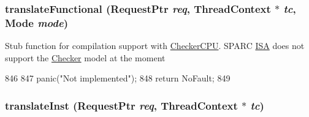 \hypertarget{classSparcISA_1_1TLB_a26658814c6c9034665aae19cf25545bb}{
\subsubsection[{translateFunctional}]{ translateFunctional ({\bf RequestPtr} {\em req}, \/  {\bf ThreadContext} $\ast$ {\em tc}, \/  {\bf Mode} {\em mode})}}
\label{classSparcISA_1_1TLB_a26658814c6c9034665aae19cf25545bb}
Stub function for compilation support with \hyperlink{classCheckerCPU}{CheckerCPU}. SPARC \hyperlink{classSparcISA_1_1ISA}{ISA} does not support the \hyperlink{classChecker}{Checker} model at the moment 


\begin{DoxyCode}
846 {
847     panic("Not implemented\n");
848     return NoFault;
849 }
\end{DoxyCode}
\hypertarget{classSparcISA_1_1TLB_a072afd8ed455dade4c25a85510e5a4da}{
\subsubsection[{translateInst}]{ translateInst ({\bf RequestPtr} {\em req}, \/  {\bf ThreadContext} $\ast$ {\em tc})}}
\label{classSparcISA_1_1TLB_a072afd8ed455dade4c25a85510e5a4da}



